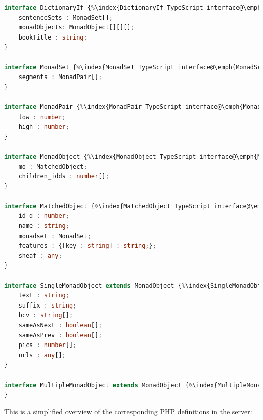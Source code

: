 \documentclass[11pt,oneside,a4paper]{memoir}
\begin{document}
\begin{lstlisting}[language=TypeScript]
interface DictionaryIf {%\index{DictionaryIf TypeScript interface@\emph{DictionaryIf} TypeScript interface}%
    sentenceSets : MonadSet[];
    monadObjects: MonadObject[][][];
    bookTitle : string;
}

interface MonadSet {%\index{MonadSet TypeScript interface@\emph{MonadSet} TypeScript interface}%
    segments : MonadPair[];
}

interface MonadPair {%\index{MonadPair TypeScript interface@\emph{MonadPair} TypeScript interface}%
    low : number;
    high : number;
}

interface MonadObject {%\index{MonadObject TypeScript interface@\emph{MonadObject} TypeScript interface}%
    mo : MatchedObject;
    children_idds : number[];
}

interface MatchedObject {%\index{MatchedObject TypeScript interface@\emph{MatchedObject} TypeScript interface}%
    id_d : number;
    name : string;
    monadset : MonadSet;
    features : {[key : string] : string;};
    sheaf : any;
}

interface SingleMonadObject extends MonadObject {%\index{SingleMonadObject TypeScript interface@\emph{SingleMonadObject} TypeScript interface}%
    text : string;
    suffix : string;
    bcv : string[];
    sameAsNext : boolean[];
    sameAsPrev : boolean[];
    pics : number[];
    urls : any[];
}

interface MultipleMonadObject extends MonadObject {%\index{MultipleMonadObject TypeScript interface@\emph{MultipleMonadObject} TypeScript interface}%
}
\end{lstlisting}

This is a simplified overview of the corresponding PHP definitions in the server:
\end{document}

